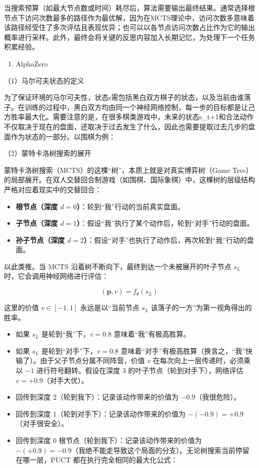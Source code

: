 当搜索预算（如最大节点数或时间）耗尽后，算法需要输出最终结果。通常选择根节点下访问次数最多的路径作为最优解，因为在MCTS理论中，访问次数多意味着该路径经受住了多次评估且表现优异；也可以以各节点访问次数占比作为它的输出概率进行采样。此外，最终会将关键的反思内容加入长期记忆，为处理下一个任务积累经验。

\begin{enumerate}
\def\labelenumi{\arabic{enumi}.}
\setcounter{enumi}{1}
\tightlist
\item
  AlphaZero
\end{enumerate}

（1）马尔可夫状态的定义

为了保证环境的马尔可夫性，状态s需包括黑白双方棋子的状态，以及当前由谁落子。在训练的过程中，黑白双方均由同一个神经网络控制，每一步的目标都是让己方胜率最大化。需要注意的是，在很多棋类游戏中，未来的状态s\_t+1和合法动作不仅取决于现在的盘面，还取决于过去发生了什么，因此也需要提取过去几步的盘面作为状态的一部分。以围棋为例：

（2）蒙特卡洛树搜索的展开

蒙特卡洛树搜索（MCTS）的这棵``树''，本质上就是对真实博弈树（Game Tree）的局部展开。在双人交替回合制游戏（如围棋、国际象棋）中，这棵树的层级结构严格对应着现实中的交替回合：

\begin{itemize}
\tightlist
\item
  \textbf{根节点（深度 \(d=0\)）}：轮到``我''行动的当前真实盘面。
\item
  \textbf{子节点（深度 \(d=1\)）}：假设``我''执行了某个动作后，轮到``对手''行动的盘面。
\item
  \textbf{孙子节点（深度 \(d=2\)）}：假设``对手''也执行了动作后，再次轮到``我''行动的盘面。
\end{itemize}

以此类推。当 MCTS 沿着树不断向下，最终到达一个未被展开的叶子节点 \(s_L\) 时，它会调用神经网络进行评估：

\[
(\mathbf{p},v)=f_\theta(s_L)
\]

这里的价值 \(v\in[-1,1]\) 永远是以``当前节点 \(s_L\) 该落子的一方''为第一视角得出的胜率。

\begin{itemize}
\item
  如果 \(s_L\) 是轮到``我''下，\(v=0.8\) 意味着``我''有极高胜算。
\item
  如果 \(s_L\) 是轮到``对手''下，\(v=0.8\) 意味着``对手''有极高胜算（换言之，``我''快输了）。由于父子节点分属不同阵营，价值 \(v\) 在每次向上一层传递时，必须乘以 \(-1\) 进行符号翻转。假设在深度 3 的叶子节点（轮到对手下），网络评估 \(v=+0.9\)（对手大优）。
\item
  回传到深度 2（轮到我下）：记录该动作带来的价值为 \(-0.9\)（我很危险）。
\item
  回传到深度 1（轮到对手下）：记录该动作带来的价值为 \(-(-0.9)=+0.9\)（对手很安全）。
\item
  回传到深度 0 根节点（轮到我下）：记录该动作带来的价值为 \(-(+0.9)=-0.9\)（我绝不能走导致这个局面的分支）。无论树搜索当前停留在哪一层，PUCT 都在执行完全相同的最大化公式：
\end{itemize}

